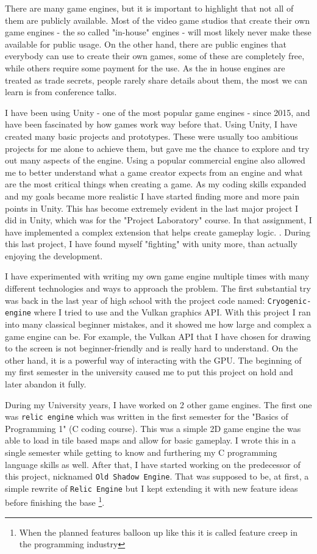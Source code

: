 There are many game engines, but it is important to highlight that not all of them are publicly available.
Most of the video game studios that create their own game engines - the so called "in-house" engines - will most likely never make these available for public usage.
On the other hand, there are public engines that everybody can use to create their own games, some of these are completely free, while others require some payment for the use.
As the in house engines are treated as trade secrets, people rarely share details about them, the most we can learn is from conference talks.

I have been using Unity - one of the most popular game engines - since 2015, and have been fascinated by how games work way before that.
Using Unity, I have created many basic projects and prototypes.
These were usually too ambitious projects for me alone to achieve them, but gave me the chance to explore and try out many aspects of the engine.
Using a popular commercial engine also allowed me to better understand what a game creator expects from an engine and what are the most critical things when creating a game.
As my coding skills expanded and my goals became more realistic I have started finding more and more pain points in Unity.
This has become extremely evident in the last major project I did in Unity, which was for the "Project Laboratory" course.
In that assignment, I have implemented a complex extension that helps create gameplay logic. \cite{szajberpunk-logic-system}.
During this last project, I have found myself "fighting" with unity more, than actually enjoying the development.

I have experimented with writing my own game engine multiple times with many different technologies and ways to approach the problem.
The first substantial try was back in the last year of high school with the project code named: \verb|Cryogenic-engine| where I tried to use \Csh and the Vulkan graphics API.
With this project I ran into many classical beginner mistakes, and it showed me how large and complex a game engine can be.
For example, the Vulkan API that I have chosen for drawing to the screen is not beginner-friendly and is really hard to understand.
On the other hand, it is a powerful way of interacting with the GPU. The beginning of my first semester in the university caused me to put this project on hold and later abandon it fully.

During my University years, I have worked on 2 other game engines.
The first one was \verb|relic engine| which was written in the first semester for the "Basics of Programming 1" (C coding course).
This was a simple 2D game engine the was able to load in tile based maps and allow for basic gameplay.
I wrote this in a single semester while getting to know and furthering my C programming language skills as well.
After that, I have started working on the predecessor of this project, nicknamed \verb|Old Shadow Engine|.
That was supposed to be, at first, a simple rewrite of \verb|Relic Engine| but I kept extending it with new feature ideas before finishing the base
\footnote{When the planned features balloon up like this it is called feature creep in the programming industry}.


